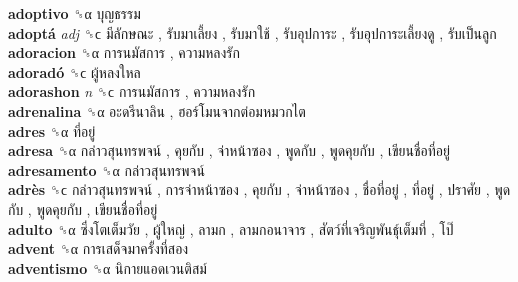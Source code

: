 \textbf{adoptivo} ␝α   บุญธรรม   \\
\textbf{adoptá} \emph{adj}  ␝ϲ   มีลักษณะ ,  รับมาเลี้ยง ,  รับมาใช้ ,  รับอุปการะ ,  รับอุปการะเลี้ยงดู ,  รับเป็นลูก   \\
\textbf{adoracion} ␝α   การนมัสการ ,  ความหลงรัก   \\
\textbf{adoradó} ␝ϲ   ผู้หลงใหล   \\
\textbf{adorashon} \emph{n}  ␝ϲ   การนมัสการ ,  ความหลงรัก   \\
\textbf{adrenalina} ␝α   อะดรีนาลิน ,  ฮอร์โมนจากต่อมหมวกไต   \\
\textbf{adres} ␝α   ที่อยู่   \\
\textbf{adresa} ␝α   กล่าวสุนทรพจน์ ,  คุยกับ ,  จ่าหน้าซอง ,  พูดกับ ,  พูดคุยกับ ,  เขียนชื่อที่อยู่   \\
\textbf{adresamento} ␝α   กล่าวสุนทรพจน์   \\
\textbf{adrès} ␝ϲ   กล่าวสุนทรพจน์ ,  การจ่าหน้าซอง ,  คุยกับ ,  จ่าหน้าซอง ,  ชื่อที่อยู่ ,  ที่อยู่ ,  ปราศัย ,  พูดกับ ,  พูดคุยกับ ,  เขียนชื่อที่อยู่   \\
\textbf{adulto} ␝α   ซึ่งโตเต็มวัย ,  ผู้ใหญ่ ,  ลามก ,  ลามกอนาจาร ,  สัตว์ที่เจริญพันธุ์เต็มที่ ,  โป๊   \\
\textbf{advent} ␝α   การเสด็จมาครั้งที่สอง   \\
\textbf{adventismo} ␝α   นิกายแอดเวนติสม์   \\
